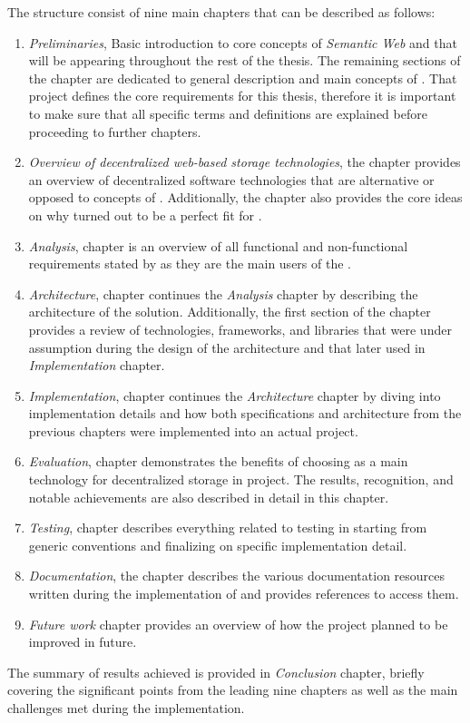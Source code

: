 The structure consist of nine main chapters that can be described as follows:
\begin{enumerate}
    \item \textit{Preliminaries}, Basic introduction to core concepts of \textit{Semantic Web} and \solid{} that will be appearing throughout the rest of the thesis. The remaining sections of the chapter are dedicated to general description and main concepts of \lpa{}. That project defines the core requirements for this thesis, therefore it is important to make sure that all \lpa{} specific terms and definitions are explained before proceeding to further chapters.
    
    \item \textit{Overview of decentralized web-based storage technologies}, the chapter provides an overview of decentralized software technologies that are alternative or opposed to concepts of \solid{}. Additionally, the chapter also provides the core ideas on why \solid{} turned out to be a perfect fit for \lpa{}.

    \item \textit{Analysis}, chapter is an overview of all functional and non-functional requirements stated by \lpa{} as they are the main users of the \lpas{}.

    \item \textit{Architecture}, chapter continues the \textit{Analysis} chapter by describing the architecture of the solution. Additionally, the first section of the chapter provides a review of technologies, frameworks, and libraries that were under assumption during the design of the architecture and that later used in \textit{Implementation} chapter.  

    \item \textit{Implementation}, chapter continues the \textit{Architecture} chapter by diving into implementation details and how both specifications and architecture from the previous chapters were implemented into an actual project. 
    
    \item \textit{Evaluation}, chapter demonstrates the benefits of choosing \solid{} as a main technology for decentralized storage in \lpa{} project. The results, recognition, and notable achievements are also described in detail in this chapter.
    
    \item \textit{Testing}, chapter describes everything related to testing in \lpas{} starting from generic conventions and finalizing on specific implementation detail.
    
    \item \textit{Documentation}, the chapter describes the various documentation resources written during the implementation of \lpa{} and provides references to access them.
     
     \item \textit{Future work} chapter provides an overview of how the project planned to be improved in future. 
\end{enumerate}

The summary of results achieved is provided in \textit{Conclusion} chapter, briefly covering the significant points from the leading nine chapters as well as the main challenges met during the implementation.